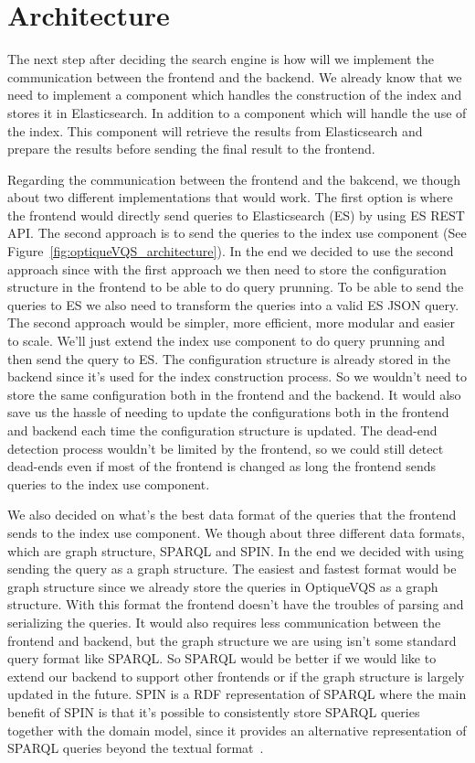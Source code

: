 \documentclass[a4paper,english]{ifimaster/ifimaster}
\begin{document}
\newpage
\section{Architecture}
The next step after deciding the search engine is how will we implement the communication between the frontend and the backend. We already know that we need to implement a component which handles the construction of the index and stores it in Elasticsearch. In addition to a component which will handle the use of the index. This component will retrieve the results from Elasticsearch and prepare the results before sending the final result to the frontend.

Regarding the communication between the frontend and the bakcend, we though about two different implementations that would work. The first option is where the frontend would directly send queries to Elasticsearch (ES) by using ES REST API. The second approach is to send the queries to the index use component (See Figure~\ref{fig:optiqueVQS_architecture}). In the end we decided to use the second approach since with the first approach we then need to store the configuration structure in the frontend to be able to do query prunning. To be able to send the queries to ES we also need to transform the queries into a valid ES JSON query. The second approach would be simpler, more efficient, more modular and easier to scale. We'll just extend the index use component to do query prunning and then send the query to ES. The configuration structure is already stored in the backend since it's used for the index construction process. So we wouldn't need to store the same configuration both in the frontend and the backend. It would also save us the hassle of needing to update the configurations both in the frontend and backend each time the configuration structure is updated. The dead-end detection process wouldn't be limited by the frontend, so we could still detect dead-ends even if most of the frontend is changed as long the frontend sends queries to the index use component.

We also decided on what's the best data format of the queries that the frontend sends to the index use component. We though about three different data formats, which are graph structure, SPARQL and SPIN. In the end we decided with using sending the query as a graph structure. The easiest and fastest format would be graph structure since we already store the queries in OptiqueVQS as a graph structure. With this format the frontend doesn't have the troubles of parsing and serializing the queries. It would also requires less communication between the frontend and backend, but the graph structure we are using isn't some standard query format like SPARQL. So SPARQL would be better if we would like to extend our backend to support other frontends or if the graph structure is largely updated in the future. SPIN is a RDF representation of SPARQL where the main benefit of SPIN is that it's possible to consistently store SPARQL queries together with the domain model, since it provides an alternative representation of SPARQL queries beyond the textual format~\cite{SPIN_W3C}. 
\end{document}
